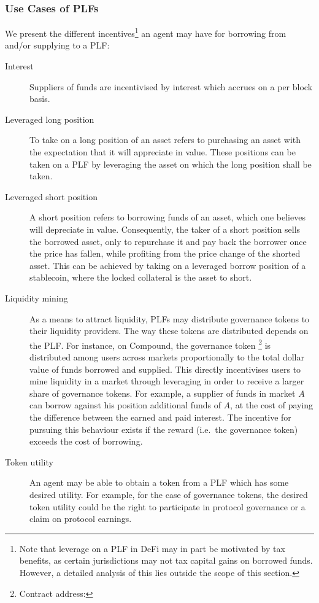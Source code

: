 \subsubsection{Use Cases of PLFs}
We present the different incentives\footnote{Note that leverage on a PLF in DeFi may in part be motivated by tax benefits, as certain jurisdictions may not tax capital gains on borrowed funds. 
However, a detailed analysis of this lies outside the scope of this section.} an agent may have for borrowing from and/or supplying to a PLF:
\begin{description}
    \item[Interest] Suppliers of funds are incentivised by interest which accrues on a per block basis.

    \item[Leveraged long position] To take on a long position of an asset refers to purchasing an asset with the expectation that it will appreciate in value. 
    These positions can be taken on a PLF by leveraging the asset on which the long position shall be taken.

    \item[Leveraged short position] A short position refers to borrowing funds of an asset, which one believes will depreciate in value. 
    Consequently, the taker of a short position sells the borrowed asset, only to repurchase it and pay back the borrower once the price has fallen, while profiting from the price change of the shorted asset.
    This can be achieved by taking on a leveraged borrow position of a stablecoin, where the locked collateral is the asset to short.

    \item[Liquidity mining] As a means to attract liquidity, PLFs may distribute governance tokens to their liquidity providers.
    The way these tokens are distributed depends on the PLF. 
    For instance, on Compound, the governance token \footnote{Contract address: } is distributed among users across markets proportionally to the total dollar value of funds borrowed and supplied.
    This directly incentivises users to mine liquidity in a market through leveraging in order to receive a larger share of governance tokens.
    For example, a supplier of funds in market $A$ can borrow against his position additional funds of $A$, at the cost of paying the difference between the earned and paid interest. 
    The incentive for pursuing this behaviour exists if the reward (i.e.\ the governance token) exceeds the cost of borrowing.
    
    \item[Token utility] An agent may be able to obtain a token from a PLF which has some desired utility.
    For example, for the case of governance tokens, the desired token utility could be the right to participate in protocol governance or a claim on protocol earnings.
    
    
\end{description}


